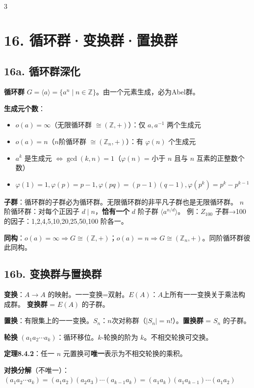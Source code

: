 \documentclass[10pt,a4paper,landscape]{ctexart}
\begin{document}
\begin{multicols}{3}
\section*{16. 循环群·变换群·置换群}

\subsection*{16a. 循环群深化}

\textbf{循环群} $G=\langle a\rangle=\{a^n\mid n\in\mathbb{Z}\}$。由一个元素生成，必为Abel群。

\textbf{生成元个数}：
\begin{itemize}
\item $o(a)=\infty$（无限循环群 $\cong(\mathbb{Z},+)$）：仅 $a,a^{-1}$ 两个生成元
\item $o(a)=n$（$n$阶循环群 $\cong(\mathbb{Z}_n,+)$）：有 $\varphi(n)$ 个生成元
\item $a^k$ 是生成元 $\iff\gcd(k,n)=1$（$\varphi(n)$ = 小于 $n$ 且与 $n$ 互素的正整数个数）
\item $\varphi(1)=1,\varphi(p)=p-1,\varphi(pq)=(p-1)(q-1),\varphi(p^k)=p^k-p^{k-1}$
\end{itemize}

\textbf{子群}：循环群的子群必为循环群。无限循环群的非平凡子群也是无限循环群。
$n$ 阶循环群：对每个正因子 $d\mid n$，\textbf{恰有一个} $d$ 阶子群 $\langle a^{n/d}\rangle$。
例：$Z_{100}$ 子群→100的因子：1,2,4,5,10,20,25,50,100 阶各一。

\textbf{同构}：$o(a)=\infty\Rightarrow G\cong(\mathbb{Z},+)$；$o(a)=n\Rightarrow G\cong(\mathbb{Z}_n,+)$。同阶循环群彼此同构。

\subsection*{16b. 变换群与置换群}

\textbf{变换}：$A\to A$ 的映射。一一变换=双射。$E(A)$：$A$上所有一一变换关于乘法构成群。
\textbf{变换群} = $E(A)$ 的子群。

\textbf{置换}：有限集上的一一变换。$S_n$：$n$次对称群（$|S_n|=n!$）。\textbf{置换群} = $S_n$ 的子群。

\textbf{轮换} $(a_1a_2\cdots a_k)$：循环移位。$k$-轮换的阶为 $k$。不相交轮换可交换。

\textbf{定理8.4.2}：任一 $n$ 元置换可\textbf{唯一}表示为不相交轮换的乘积。

\textbf{对换分解}（不唯一）：
$(a_1a_2\cdots a_k)=(a_1a_2)(a_2a_3)\cdots(a_{k-1}a_k)=(a_1a_k)(a_1a_{k-1})\cdots(a_1a_2)$


\end{multicols}
\end{document}
